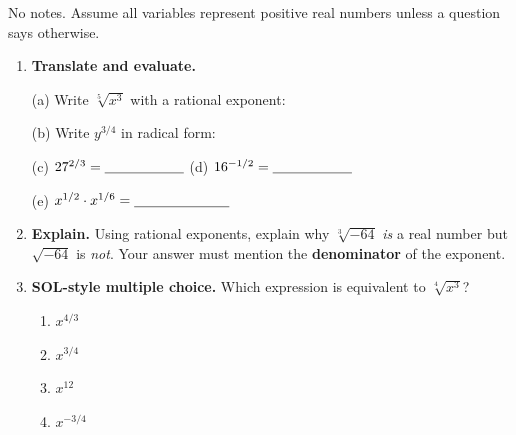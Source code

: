 \documentclass[10pt]{article}
\begin{document}
\namedateperiod

\vspace{0.10in}

No notes. Assume all variables represent positive real numbers unless a question says otherwise.

\begin{enumerate}[leftmargin=1.8em, itemsep=10pt]
  \item \textbf{Translate and evaluate.}

        \vspace{4pt}
        (a) Write $\sqrt[5]{x^{3}}$ with a rational exponent: \blank{2.4cm}

        \vspace{4pt}
        (b) Write $y^{3/4}$ in radical form: \blank{2.8cm}

        \vspace{4pt}
        (c) $27^{2/3} = \blank{2.0cm}$ \hspace{0.6in}
        (d) $16^{-1/2} = \blank{2.0cm}$

        \vspace{4pt}
        (e) $x^{1/2}\cdot x^{1/6} = \blank{2.4cm}$

  \item \textbf{Explain.} Using rational exponents, explain why $\sqrt[3]{-64}$ \emph{is} a real
        number but $\sqrt{-64}$ is \emph{not}. Your answer must mention the \textbf{denominator} of
        the exponent.

  \item \textbf{SOL-style multiple choice.} Which expression is equivalent to $\sqrt[4]{x^{3}}$?
        \begin{enumerate}[label=\Alph*., leftmargin=1.9em, itemsep=1pt]
          \item $x^{4/3}$
          \item $x^{3/4}$
          \item $x^{12}$
          \item $x^{-3/4}$
        \end{enumerate}
\end{enumerate}
\end{document}
